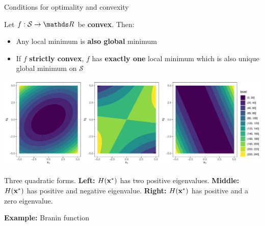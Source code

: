 \documentclass[11pt,compress,t,notes=noshow, xcolor=table]{beamer}
\begin{document}
\begin{vbframe}{Conditions for optimality and convexity}

Let $f:\mathcal{S} \to \R$ be \textbf{convex}.
Then:

\begin{itemize}
    \item Any local minimum is \textbf{also global} minimum 
    \item If $f$ \textbf{strictly convex}, $f$ has \textbf{exactly one} local minimum which is also unique global minimum on $\mathcal{S}$
\end{itemize}

\begin{center}
    \includegraphics[width = 1\textwidth]{figure_man/hessian-eigenvalues.pdf} \\
    \begin{footnotesize}
      Three quadratic forms.
      \textbf{Left:} $H(\mathbf{x}^\ast)$ has two positive eigenvalues.
      \textbf{Middle:} $H(\mathbf{x}^\ast)$ has positive and negative eigenvalue.
      \textbf{Right:} $H(\mathbf{x}^\ast)$ has positive and a zero eigenvalue.
    \end{footnotesize}
\end{center}

\framebreak 

\textbf{Example:} Branin function

\vspace{-3\baselineskip}


\end{vbframe}
\end{document}
